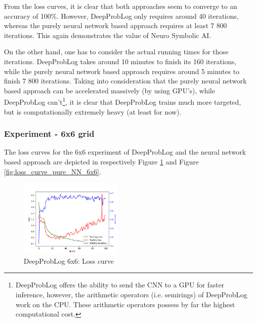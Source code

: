 \documentclass[english]{sobraep}
\begin{document}
From the loss curves, it is clear that both approaches seem to converge to an accuracy of 100\%. However, DeepProbLog only requires around 40 iterations, whereas the purely neural network based approach requires at least 7 800 iterations. This again demonstrates the value of Neuro Symbolic AI.

On the other hand, one has to consider the actual running times for those iterations. DeepProbLog takes around 10 minutes to finish its 160 iterations, while the purely neural network based approach requires around 5 minutes to finish 7 800 iterations. Taking into consideration that the purely neural network based approach can be accelerated massively (by using GPU's), while DeepProbLog can't\footnote{DeepProbLog offers the ability to send the CNN to a GPU for faster inference, however, the arithmetic operators (i.e. semirings) of DeepProbLog work on the CPU. These arithmetic operators possess by far the highest computational cost.}, it is clear that DeepProbLog trains much more targeted, but is computationally extremely heavy (at least for now).

\subsubsection{Experiment - 6x6 grid}
The loss curves for the 6x6 experiment of DeepProbLog and the neural network based approach are depicted in respectively Figure \ref{fig:loss_curve_deepproblog_6x6} and Figure \ref{fig:loss_curve_pure_NN_6x6}.

\begin{figure}[htp]
    \begin{center}
    \includegraphics[width=0.45\textwidth]{loss_curve_deepproblog_6x6.png} 
    \captionsetup{justification=centering}
    \caption{DeepProbLog 6x6: Loss curve}
    \label{fig:loss_curve_deepproblog_6x6}
    \end{center}
\end{figure}
\end{document}
